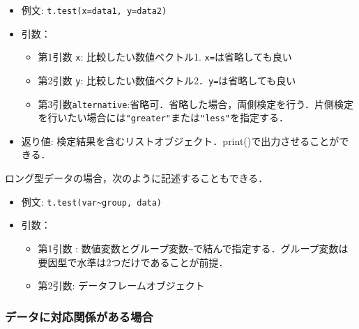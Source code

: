 \documentclass[
  xelatex, ja=standard]{bxjsarticle}
\providecommand{\tightlist}{%
  \setlength{\itemsep}{0pt}\setlength{\parskip}{0pt}}
\begin{document}
\begin{itemize}
\tightlist
\item
  例文: \texttt{t.test(x=data1,\ y=data2)}
\item
  引数：

  \begin{itemize}
  \tightlist
  \item
    第1引数 \texttt{x}: 比較したい数値ベクトル1.
    \texttt{x=}は省略しても良い
  \item
    第2引数 \texttt{y}:
    比較したい数値ベクトル2．\texttt{y=}は省略しても良い
  \item
    第3引数\texttt{alternative}:省略可．省略した場合，両側検定を行う．片側検定を行いたい場合には\texttt{"greater"}または\texttt{"less"}を指定する．
  \end{itemize}
\item
  返り値:
  検定結果を含むリストオブジェクト．print()で出力させることができる．
\end{itemize}

ロング型データの場合，次のように記述することもできる．

\begin{itemize}
\tightlist
\item
  例文: \texttt{t.test(var\textasciitilde{}group,\ data)}
\item
  引数：

  \begin{itemize}
  \tightlist
  \item
    第1引数 :
    数値変数とグループ変数\texttt{\textasciitilde{}}で結んで指定する．グループ変数は要因型で水準は2つだけであることが前提．
  \item
    第2引数: データフレームオブジェクト
  \end{itemize}
\end{itemize}

\subsubsection{データに対応関係がある場合}\label{ux30c7ux30fcux30bfux306bux5bfeux5fdcux95a2ux4fc2ux304cux3042ux308bux5834ux5408}
\end{document}
